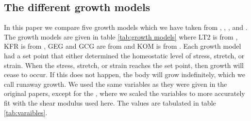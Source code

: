 \subsection{The different growth models}
\label{sub:different models}
In this paper we compare five growth models which we have taken from \citep{Taber1998}, \citep{Kroon2009}, \citep{Goktepe}, and \citep{Kerckhoffs2012}. The growth models are given in table \ref{tab:growth models} where LT2 is from \citep{Taber1998}, KFR is from \citep{Kroon2009}, GEG and GCG are from \citep{Goktepe} and KOM is from \citep{Kerckhoffs2012}. Each growth model had a set point that either determined the homeostatic level of stress, stretch, or strain. When the stress, stretch, or strain reaches the set point, then growth will cease to occur. If this does not happen, the body will grow indefinitely, which we call runaway growth. We used the same variables as they were given in the original papers, except for the , where we scaled the variables to more accurately fit with the shear modulus used here. The values are tabulated in table \ref{tab:varaibles}.
